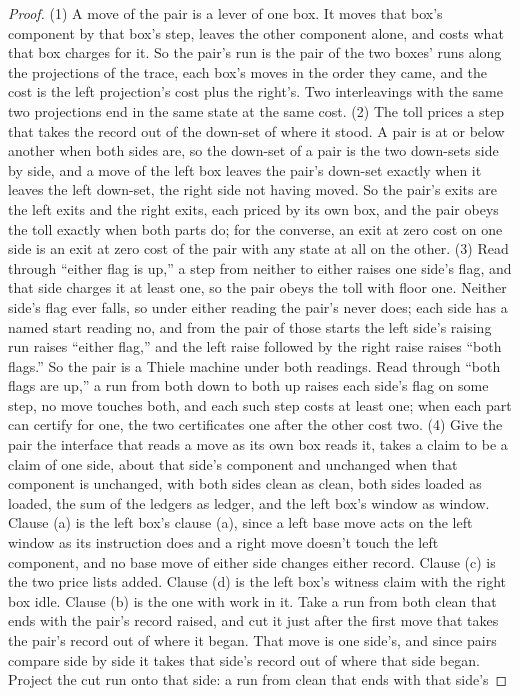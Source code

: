 \documentclass[11pt,twoside]{article}
\theoremstyle{thielethm}
\theoremstyle{thieledef}
\theoremstyle{thieledef}
\theoremstyle{thieledef}
\theoremstyle{thielethm}
\theoremstyle{thieleobs}
\theoremstyle{thielethm}
\begin{document}
\begin{proof}
(1) A move of the pair is a lever of one box. It moves that box's component by that box's step,
leaves the other component alone, and costs what that box charges for it. So the pair's run is the
pair of the two boxes' runs along the projections of the trace, each box's moves in the order they
came, and the cost is the left projection's cost plus the right's. Two interleavings with the same
two projections end in the same state at the same cost. (2) The toll prices a step that takes the
record out of the down-set of where it stood. A pair is at or below another when both sides are, so
the down-set of a pair is the two down-sets side by side, and a move of the left box leaves the
pair's down-set exactly when it leaves the left down-set, the right side not having moved. So the
pair's exits are the left exits and the right exits, each priced by its own box, and the pair obeys
the toll exactly when both parts do; for the converse, an exit at zero cost on one side is an exit at
zero cost of the pair with any state at all on the other. (3) Read through ``either flag is up,'' a step from
neither to either raises one side's flag, and that side charges it at least one, so the pair obeys
the toll with floor one. Neither side's flag ever falls, so under either reading the pair's never
does; each side has a named start reading no, and from the pair of those starts the left side's
raising run raises ``either flag,'' and the left raise followed by the right raise raises ``both
flags.'' So the pair is a Thiele machine under both readings. Read through ``both flags are up,'' a run from both down to
both up raises each side's flag on some step, no move touches both, and each such step costs at
least one; when each part can certify for one, the two certificates one after the other cost two.
(4) Give the pair the interface that reads a move as its own box reads it, takes a claim to be a
claim of one side, about that side's component and unchanged when that component is unchanged,
with both sides clean as clean, both sides loaded as loaded, the sum of the ledgers as ledger, and
the left box's window as window. Clause (a) is the left box's clause (a), since a left base move
acts on the left window as its instruction does and a right move doesn't touch the left component,
and no base move of either side changes either record. Clause (c) is the two price lists added.
Clause (d) is the left box's witness claim with the right box idle. Clause (b) is the one with
work in it. Take a run from both clean that ends with the pair's record raised, and cut it just after the first move that takes the pair's record out of where it began. That move is one side's, and since pairs compare side by side it takes that side's record out of where that side began. Project the cut run onto that side: a run from clean that ends with that side's

\end{proof}
\end{document}
